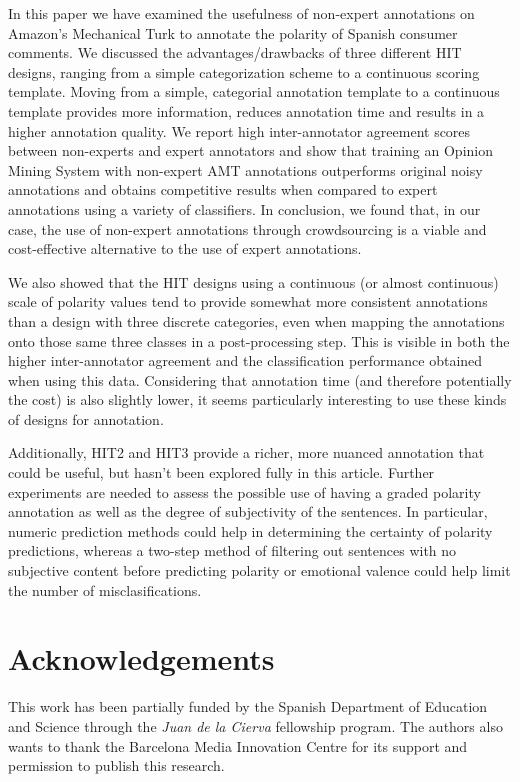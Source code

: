 \documentclass[11pt, a4paper,onecolumn]{article}
\begin{document}
In this paper we have examined the usefulness of non-expert annotations on Amazon's Mechanical Turk to annotate the polarity of Spanish consumer comments. We discussed the advantages/drawbacks of three different HIT designs, ranging from a simple categorization scheme to a continuous scoring template. Moving from a simple, categorial annotation template to a continuous template provides more information, reduces annotation time and results in a higher annotation quality. We report high inter-annotator agreement scores between non-experts and expert annotators and show that training an Opinion Mining System with non-expert AMT annotations outperforms original noisy annotations and obtains competitive results when compared to expert annotations using a variety of classifiers. In conclusion, we found that, in our case, the use of non-expert annotations through crowdsourcing is a viable and cost-effective alternative to the use of expert annotations.

We also showed that the HIT designs using a continuous (or almost continuous) scale of polarity values tend to provide somewhat more consistent annotations than a design with three discrete categories, even when mapping the annotations onto those same three classes in a post-processing step.  This is visible in both the higher inter-annotator agreement and the classification performance obtained when using this data.  Considering that annotation time (and therefore potentially the cost) is also slightly lower, it seems particularly interesting to use these kinds of designs for annotation.

Additionally, HIT2 and HIT3 provide a richer, more nuanced annotation that could be useful, but hasn't been explored fully in this article.  Further experiments are needed to assess the possible use of having a graded polarity annotation as well as the degree of subjectivity of the sentences.  In particular, numeric prediction methods could help in determining the certainty of polarity predictions, whereas a two-step method of filtering out sentences with no subjective content before predicting polarity or emotional valence could help limit the number of misclasifications.


\section{Acknowledgements}

This work has been partially funded by the Spanish Department of Education and Science through the \textit{Juan de la Cierva} fellowship program. The authors also wants to thank the Barcelona Media Innovation Centre for its support and permission to publish this research. 





\end{document}
